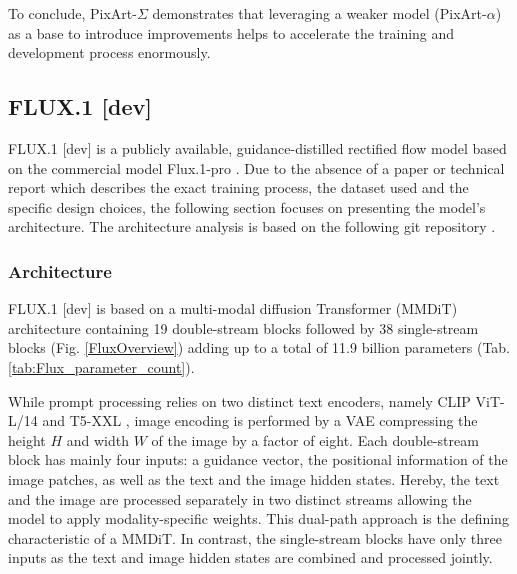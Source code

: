 To conclude, PixArt-$\Sigma$ demonstrates that leveraging a weaker model (PixArt-$\alpha$) as a base to introduce improvements helps to accelerate the training and development process enormously. 



\subsection{FLUX.1 {[dev]}}
FLUX.1 {[dev]} \cite{Flux} is a publicly available, guidance-distilled rectified flow model based on the commercial model Flux.1-pro \cite{Flux}. Due to the absence of a paper or technical report which describes the exact training process, the dataset used and the specific design choices, the following section focuses on presenting the model's architecture. The architecture analysis is based on the following git repository \cite{kohya_ss_sd_scripts_2024}.

\subsubsection{Architecture}
FLUX.1 {[dev]} is based on a multi-modal diffusion Transformer (\gls{MMDiT}) \cite{SD3} architecture containing 19 double-stream blocks followed by 38 single-stream blocks (Fig. \ref{FluxOverview}) adding up to a total of 11.9 billion parameters (Tab. \ref{tab:Flux_parameter_count}). 

While prompt processing relies on two distinct text encoders, namely CLIP ViT-L/14 \cite{CLIP} and T5-XXL \cite{T5XXL}, image encoding is performed by a \gls{VAE} compressing the height $H$ and width $W$ of the image by a factor of eight. Each double-stream block has mainly four inputs: a guidance vector, the positional information of the image patches, as well as the text and the image hidden states. Hereby, the text and the image are processed separately in two distinct streams allowing the model to apply modality-specific weights. This dual-path approach is the defining characteristic of a \gls{MMDiT}. In contrast, the single-stream blocks have only three inputs as the text and image hidden states are combined and processed jointly.  

